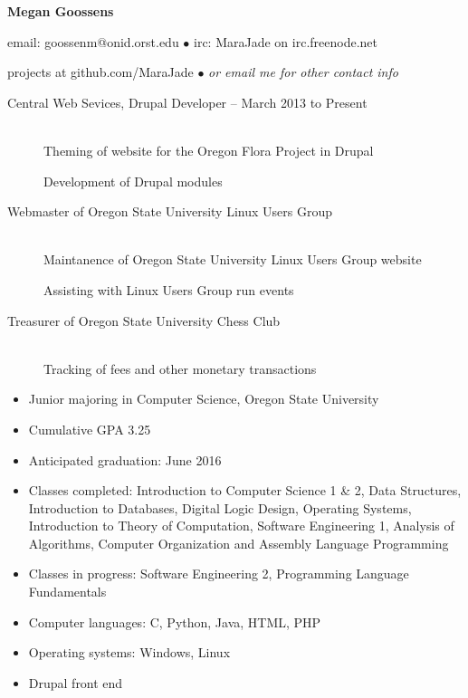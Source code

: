\documentclass[11pt]{article}
\begin{document}
\centerline{{\LARGE \bf Megan Goossens}}

\bigskip

\centerline{email: goossenm@onid.orst.edu
        $\bullet$
        irc: MaraJade on irc.freenode.net}
\centerline{projects at github.com/MaraJade 
        $\bullet$
        \emph{or email me for other contact info}}

\bigskip
\hrulefill
\bigskip

\begin{description}
\item[Central Web Sevices, Drupal Developer -- March 2013 to Present]
    \hfill \\
    Theming of website for the Oregon Flora Project in Drupal
    
    Development of Drupal modules
\end{description}

\smallskip
\hrulefill
\bigskip

\begin{description}
     \item[Webmaster of Oregon State University Linux Users Group]
        \hfill \\
        Maintanence of Oregon State University Linux Users Group website

        Assisting with Linux Users Group run events

   \item[Treasurer of Oregon State University Chess Club]
        \hfill \\ 
        Tracking of fees and other monetary transactions
\end{description}

\smallskip
\hrulefill
\bigskip

\begin{itemize}
    \item Junior majoring in Computer Science, Oregon State University 

    \item Cumulative GPA 3.25

    \item Anticipated graduation: June 2016

    \item Classes completed: Introduction to Computer Science 1 \& 2, Data Structures, Introduction to Databases, Digital Logic Design, Operating Systems, Introduction to Theory of Computation, Software Engineering 1, Analysis of Algorithms, Computer Organization and Assembly Language Programming


    \item Classes in progress: Software Engineering 2, Programming Language Fundamentals
\end{itemize}

\begin{itemize}
  \item Computer languages: C, Python, Java, HTML, PHP

  \item Operating systems: Windows, Linux

  \item Drupal front end
\end{itemize}
\end{document}
